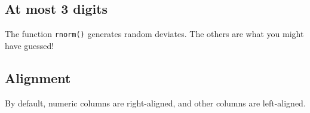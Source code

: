 \documentclass[titlepage]{book}\usepackage{knitr}
\begin{document}
\begin{knitrout}
\color{fgcolor}\begin{kframe}
\begin{alltt}
\hlstd{(} \hlstd{=}\hlstd{)}
\end{alltt}
\end{kframe}
\end{knitrout}

\subsection{At most 3 digits}

\begin{knitrout}
\color{fgcolor}\begin{kframe}
\begin{alltt}
\hlstd{(}\hlstd{(} \hlstd{=} \hlstd{(}\hlstd{),}  \hlstd{=} \hlstd{(}\hlstd{),}  \hlstd{=} \hlstd{(}\hlstd{,} \hlstd{,} \hlstd{),}
                  \hlstd{=} \hlstd{(}\hlstd{,} \hlstd{)))}
\end{alltt}
\end{kframe}
\end{knitrout}
The function \texttt{rnorm()} generates random deviates. The others are what you might have guessed!

\subsection{Alignment}

By default, numeric columns are right-aligned, and other columns are
left-aligned.

\begin{knitrout}
\color{fgcolor}\begin{kframe}
\begin{alltt}
\hlstd{(} \hlstd{=}\hlstd{(}\hlstd{,} \hlstd{,} \hlstd{,} \hlstd{,} \hlstd{))}
\end{alltt}
\end{kframe}
\end{knitrout}
\end{document}
